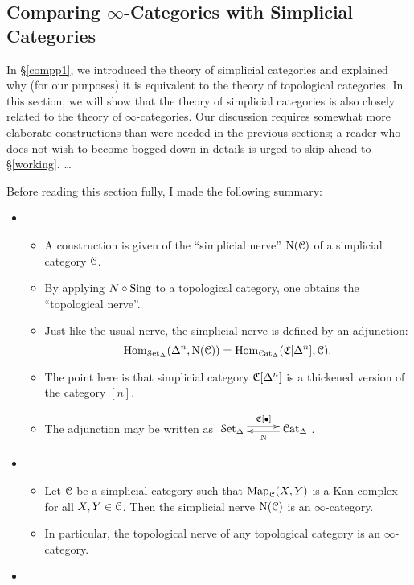 \subsection{Comparing $\infty$-Categories with Simplicial Categories}\label{theequiv}
\begin{1.1.5 inf-cats vs simplicial cats}
In \S \ref{compp1}, we introduced the theory of simplicial categories and explained why (for our purposes) it is equivalent to the theory of topological categories. In this section, we will show that the theory of simplicial categories is also closely related to the theory of $\infty$-categories.
Our discussion requires somewhat more elaborate constructions than were needed in the previous sections; a reader who does not wish to become bogged down in details is urged to skip ahead to \S \ref{working}. \ldots
\begin{shaded}
Before reading this section fully, I made the following summary:
\begin{itemize}\squishlist
\item 
\begin{itemize}\squishlist
\item A construction is given of the ``simplicial nerve'' $\operatorname{N}(\operatorname{\mathcal{C}})$ of a simplicial category $\operatorname{\mathcal{C}}$.
\item By applying $N\circ\operatorname{Sing}$ to a topological category, one obtains the ``topological nerve''.
\item Just like the usual nerve, the simplicial nerve is defined by an adjunction:
\[\operatorname{Hom}_{ \operatorname{\mathcal{S}et_{\Delta}}}( \Delta^n, \operatorname{N}(\operatorname{\mathcal{C}})) =
\operatorname{Hom}_{\operatorname{\mathcal{C}at_{\Delta}}}( \operatorname{\mathfrak{C}}[ \Delta^n ], \operatorname{\mathcal{C}}).\]
\item The point here is that simplicial category $\operatorname{\mathfrak{C}}[ \Delta^n ]$ is a thickened version of the category $[n]$.
\item The adjunction may be written as
$\xymatrix@R=.3cm@C=1cm{
\sSet  \ar@<.6ex>[r]^{\sCoNerve[\bigdot]}&
\sCat  \ar@<.4ex>[l]^{\Nerve}
}$.
\end{itemize}
\item
\begin{itemize}\squishlist
\item Let $\operatorname{\mathcal{C}}$ be a simplicial category such that $\operatorname{{Map}}_{\operatorname{\mathcal{C}}}(X,Y)$ is a Kan complex for all $X,Y\in\operatorname{\mathcal{C}}$. Then the simplicial nerve $\operatorname{N}(\operatorname{\mathcal{C}})$ is an $\infty$-category.
\item In particular, the topological nerve of any topological category is an $\infty$-category.
\end{itemize}
\item

\end{itemize}
\end{shaded}
\end{1.1.5 inf-cats vs simplicial cats}
